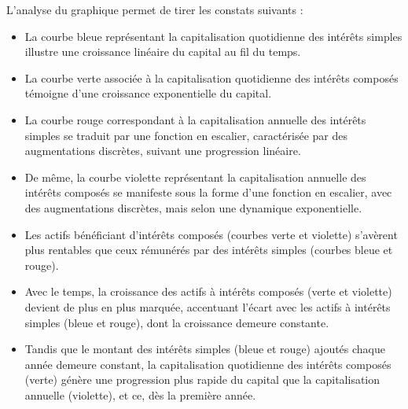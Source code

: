 \documentclass{article}
\begin{document}
\begin{enumerate}[label=\textbf{R2.\arabic*}]
                L'analyse du graphique permet de tirer les constats suivants :
                \begin{itemize}
                    \item La courbe bleue représentant la capitalisation quotidienne des intérêts simples illustre une croissance linéaire du capital au fil du temps.
                    \item La courbe verte associée à la capitalisation quotidienne des intérêts composés témoigne d'une croissance exponentielle du capital.
                    \item La courbe rouge correspondant à la capitalisation annuelle des intérêts simples se traduit par une fonction en escalier, caractérisée par des augmentations discrètes, suivant une progression linéaire.
                    \item De même, la courbe violette représentant la capitalisation annuelle des intérêts composés se manifeste sous la forme d'une fonction en escalier, avec des augmentations discrètes, mais selon une dynamique exponentielle.
                    \item Les actifs bénéficiant d’intérêts composés (courbes verte et violette) s'avèrent plus rentables que ceux rémunérés par des intérêts simples (courbes bleue et rouge).
                    \item Avec le temps, la croissance des actifs à intérêts composés (verte et violette) devient de plus en plus marquée, accentuant l’écart avec les actifs à intérêts simples (bleue et rouge), dont la croissance demeure constante.
                    \item Tandis que le montant des intérêts simples (bleue et rouge) ajoutés chaque année demeure constant, la capitalisation quotidienne des intérêts composés (verte) génère une progression plus rapide du capital que la capitalisation annuelle (violette), et ce, dès la première année.
                \end{itemize}



\end{enumerate}
\end{document}

